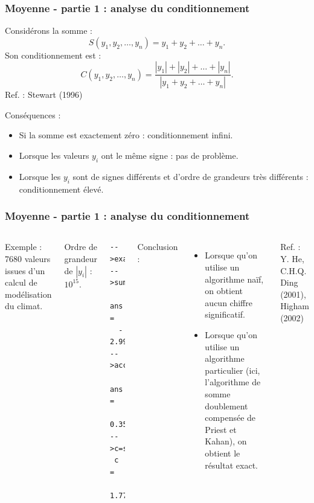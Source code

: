 \documentclass{beamer}
\begin{document}
\begin{frame}[containsverbatim]
\frametitle{Moyenne - partie 1 : analyse du conditionnement}

Considérons la somme :
$$
S(y_1,y_2,\ldots,y_n)=y_1+y_2+\ldots+y_n.
$$
Son conditionnement est :
$$
C(y_1,y_2,\ldots,y_n)=\frac{|y_1|+|y_2|+\ldots+|y_n|}{|y_1+y_2+\ldots+y_n|}.
$$
Ref. : Stewart (1996)

Conséquences :
\begin{itemize}
\item Si la somme est exactement zéro : conditionnement infini.
\item Lorsque les valeurs $y_i$ ont le même signe : pas de problème. 
\item Lorsque les $y_i$ sont de signes différents et 
d'ordre de grandeurs très différents : conditionnement élevé.
\end{itemize}

\end{frame}
\begin{frame}[containsverbatim]
\frametitle{Moyenne - partie 1 : analyse du conditionnement}

  \begin{columns}
	
Exemple : 7680 valeurs issues d'un calcul de modélisation du climat. 

Ordre de grandeur de $|y_i|$ : $10^{15}$.

\begin{lstlisting}
-->exact=0.357985839247703552;
-->sum(x)
 ans  =
  - 2.9960938  
-->accsum_dblcompsum(x)
 ans  =
    0.3579858  
-->c=sum(abs(x))/abs(sum(x))
 c  =
    1.770D+16  
\end{lstlisting}


Conclusion : 
\begin{itemize}
\item Lorsque qu'on utilise un algorithme naïf, on obtient aucun chiffre 
significatif.
\item Lorsque qu'on utilise un algorithme particulier (ici, l'algorithme 
de somme doublement compensée de Priest et Kahan), on obtient le résultat exact.
\end{itemize}

Ref. : Y. He, C.H.Q. Ding (2001), Higham (2002)


	\end{columns}
	
\end{frame}
\end{document}
